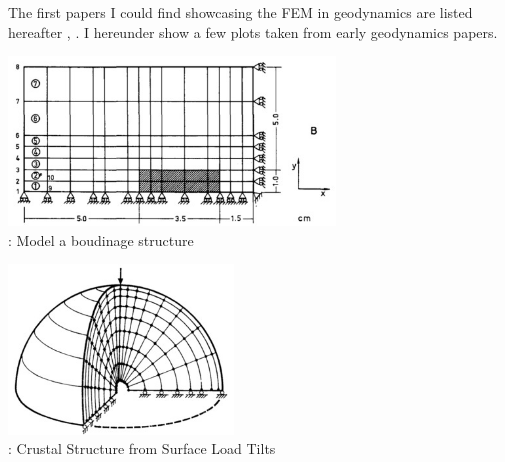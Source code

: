 
The first papers I could find showcasing the FEM in geodynamics are listed hereafter
\cite{gart78}, 
\cite{anbr80}\cite{mera80}\cite{bran80}
\cite{engl82}
\cite{thar85}\cite{scan85}
\cite{enho86}\cite{mofr86}
\cite{zupa86}
\cite{boww89}
\cite{brau94}
\cite{brbe95}.
I hereunder show a few plots taken from early geodynamics papers.


\begin{center}
\begin{minipage}{0.45\textwidth}
\centering
\includegraphics[height=4.5cm]{images/history/stbe71}\\
{: Model a boudinage structure \cite{stbe71}}
\end{minipage}\hfill
\begin{minipage}{0.45\textwidth}
\centering
\includegraphics[height=4.5cm]{images/history/bela72}\\
{: Crustal Structure from Surface Load Tilts \cite{bela72}}
\end{minipage}
\end{center}

